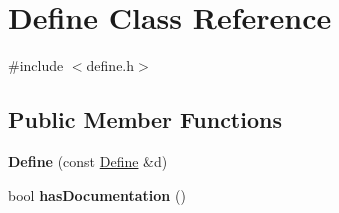 \hypertarget{class_define}{}\section{Define Class Reference}
\label{class_define}


{\ttfamily \#include $<$define.\+h$>$}

\subsection*{Public Member Functions}
\begin{DoxyCompactItemize}
\item 
\mbox{\label{class_define_a3bb88bf929e5153195417b3b40070df5}} 
{\bfseries Define} (const \mbox{\hyperlink{class_define}{Define}} \&d)
\item 
\mbox{\label{class_define_a1d2946362d2573d2f679bf16dea3313e}} 
bool {\bfseries has\+Documentation} ()
\end{DoxyCompactItemize}
